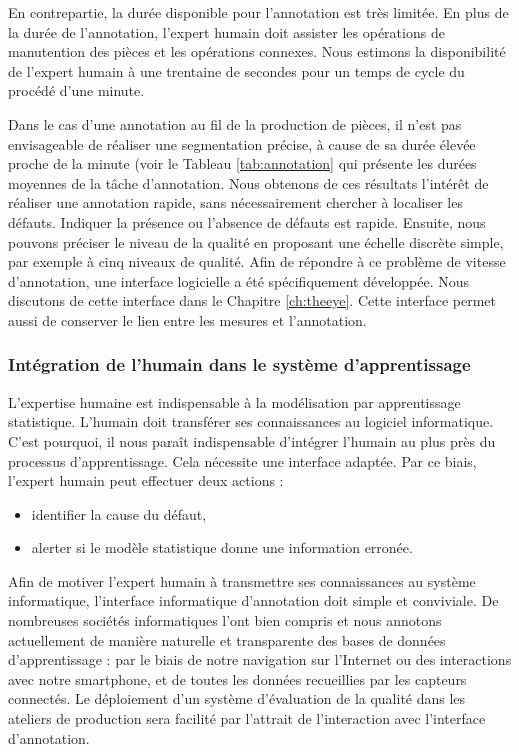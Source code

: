 En contrepartie, la durée disponible pour l'annotation est très limitée. En plus de la durée de l'annotation, l'expert humain doit assister les opérations de manutention des pièces et les opérations connexes.
Nous estimons la disponibilité de l'expert humain à une trentaine de secondes pour un temps de cycle du procédé d'une minute.

Dans le cas d'une annotation au fil de la production de pièces, il n'est pas envisageable de réaliser une segmentation précise, à cause de sa durée élevée proche de la minute (voir le Tableau \ref{tab:annotation} qui présente les durées moyennes de la tâche d'annotation.
Nous obtenons de ces résultats l'intérêt de réaliser une annotation rapide, sans nécessairement chercher à localiser les défauts.
Indiquer la présence ou l'absence de défauts est rapide.
Ensuite, nous pouvons préciser le niveau de la qualité en proposant une échelle discrète simple, par exemple à cinq niveaux de qualité.
Afin de répondre à ce problème de vitesse d'annotation, une interface logicielle a été spécifiquement développée.
Nous discutons de cette interface dans le Chapitre \ref{ch:theeye}.
Cette interface permet aussi de conserver le lien entre les mesures et l'annotation.

\subsubsection{Intégration de l'humain dans le système d'apprentissage}
L'expertise humaine est indispensable à la modélisation par apprentissage statistique.
L'humain doit transférer ses connaissances au logiciel informatique.
C'est pourquoi, il nous paraît indispensable d'intégrer l'humain au plus près du processus d'apprentissage.
Cela nécessite une interface adaptée.
Par ce biais, l'expert humain peut effectuer deux actions :
\begin{itemize}
	\item identifier la cause du défaut,
	\item alerter si le modèle statistique donne une information erronée.
\end{itemize}

Afin de motiver l'expert humain à transmettre ses connaissances au système informatique, l'interface informatique d'annotation doit simple et conviviale.
De nombreuses sociétés informatiques l'ont bien compris et nous annotons actuellement de manière naturelle et transparente des bases de données d'apprentissage : par le biais de notre navigation sur l'Internet ou des interactions avec notre smartphone, et de toutes les données recueillies par les capteurs connectés.
Le déploiement d'un système d'évaluation de la qualité dans les ateliers de production sera facilité par l'attrait de l'interaction avec l'interface d'annotation.

